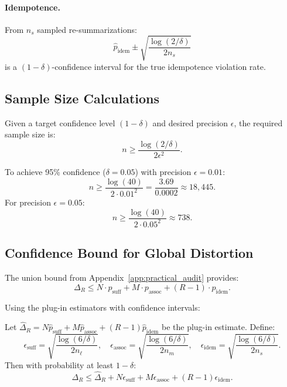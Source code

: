 \paragraph{Idempotence.}
From $n_s$ sampled re-summarizations:
\[
\hat{p}_{\text{idem}} \pm \sqrt{\frac{\log(2/\delta)}{2n_s}}
\]
is a $(1-\delta)$-confidence interval for the true idempotence violation rate.

\subsection{Sample Size Calculations}

Given a target confidence level $(1-\delta)$ and desired precision $\epsilon$, the required sample size is:
\[
n \ge \frac{\log(2/\delta)}{2\epsilon^2}.
\]

\begin{example}
To achieve 95\% confidence ($\delta = 0.05$) with precision $\epsilon = 0.01$:
\[
n \ge \frac{\log(40)}{2 \cdot 0.01^2} = \frac{3.69}{0.0002} \approx 18,\!445.
\]
For precision $\epsilon = 0.05$:
\[
n \ge \frac{\log(40)}{2 \cdot 0.05^2} \approx 738.
\]
\end{example}

\subsection{Confidence Bound for Global Distortion}

The union bound from Appendix~\ref{app:practical_audit} provides:
\[
\Delta_R \le N \cdot p_{\text{suff}} + M \cdot p_{\text{assoc}} + (R-1) \cdot p_{\text{idem}}.
\]

Using the plug-in estimators with confidence intervals:

\begin{theorem}
Let $\hat{\Delta}_R = N \hat{p}_{\text{suff}} + M \hat{p}_{\text{assoc}} + (R-1) \hat{p}_{\text{idem}}$ be the plug-in estimate. Define:
\[
\epsilon_{\text{suff}} = \sqrt{\frac{\log(6/\delta)}{2n_\ell}}, \quad
\epsilon_{\text{assoc}} = \sqrt{\frac{\log(6/\delta)}{2n_m}}, \quad
\epsilon_{\text{idem}} = \sqrt{\frac{\log(6/\delta)}{2n_s}}.
\]
Then with probability at least $1-\delta$:
\[
\Delta_R \le \hat{\Delta}_R + N \epsilon_{\text{suff}} + M \epsilon_{\text{assoc}} + (R-1) \epsilon_{\text{idem}}.
\]
\end{theorem}

